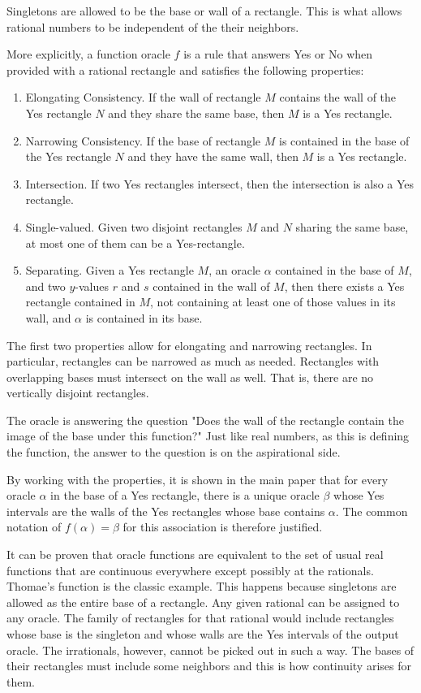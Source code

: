 \documentclass[12pt]{article}
\theoremstyle{remark}
\begin{document}
Singletons are allowed to be the base or wall of a rectangle. This is what allows rational numbers to be independent of the their neighbors.

More explicitly, a function oracle $f$ is a rule that answers Yes or No when provided with a rational rectangle and satisfies the following properties: 
\begin{enumerate}
    \item Elongating Consistency. If the wall of rectangle $M$ contains the wall of the Yes rectangle $N$ and they share the same base, then $M$ is a Yes rectangle. 
    \item Narrowing Consistency. If the base of rectangle $M$ is contained in the base of the Yes rectangle $N$ and they have the same wall, then $M$ is a Yes rectangle.  
    \item Intersection. If two Yes rectangles intersect, then the intersection is also a Yes rectangle. 
    \item Single-valued. Given two disjoint rectangles $M$ and $N$ sharing the same base, at most one of them can be a Yes-rectangle. 
    \item Separating. Given a Yes rectangle $M$, an oracle $\alpha$ contained in the base of $M$, and two $y$-values $r$ and $s$ contained in the wall of $M$, then there exists a Yes rectangle contained in $M$, not containing at least one of those values in its wall, and $\alpha$ is contained in its base.
\end{enumerate} 

The first two properties allow for elongating and narrowing rectangles. In particular, rectangles can be narrowed as much as needed. Rectangles with overlapping bases must intersect on the wall as well. That is, there are no vertically disjoint rectangles. 

The oracle is answering the question "Does the wall of the rectangle contain the image of the base under this function?" Just like real numbers, as this is defining the function, the answer to the question is on the aspirational side. 

By working with the properties, it is shown in the  main paper that for every oracle $\alpha$ in the base of a Yes rectangle, there is a unique oracle $\beta$ whose Yes intervals are the walls of the Yes rectangles whose base contains $\alpha$. The common notation of $f(\alpha) = \beta$ for this association is therefore justified. 

It can be proven that oracle functions are equivalent to the set of usual real functions that are continuous everywhere except possibly at the rationals. Thomae's function is the classic example. This happens because singletons are allowed as the entire base of a rectangle. Any given rational can be assigned to any oracle. The family of rectangles for that rational would include rectangles whose base is the singleton and whose walls are the Yes intervals of the output oracle. The irrationals, however, cannot be picked out in such a way. The bases of their rectangles must include some neighbors and this is how continuity arises for them.
\end{document}
